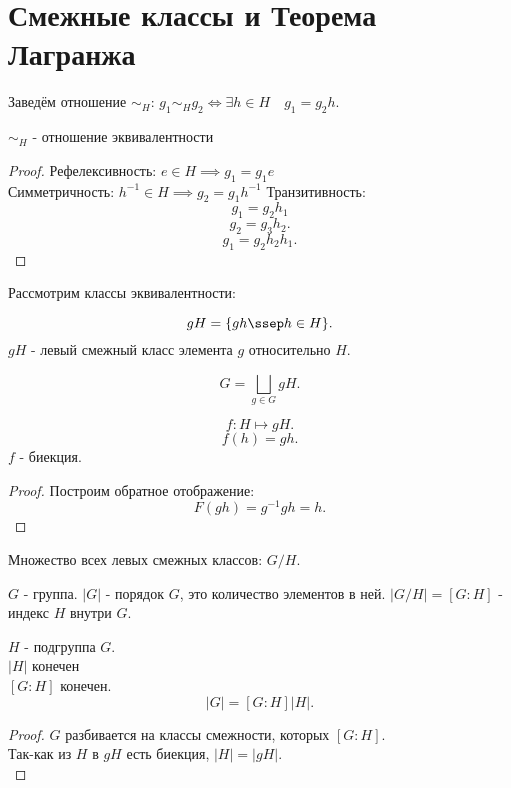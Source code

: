 \documentclass[11pt, oneside]{article}   	%
\begin{document}
\section{Смежные классы и Теорема Лагранжа}
    \begin{definition}
        Заведём отношение $\sim_H$: $g_1 \sim_H g_2 \iff \exists{h\in H}\quad g_1 = g_2h$.
    \end{definition}
    \begin{theorem}
        $\sim_H$ - отношение эквивалентности
        \begin{proof}
            Рефелексивность: $e \in H \implies g_1 = g_1e$\\
            Симметричность: $h^{-1}\in H \implies g_2 = g_1h^{-1}$
            Транзитивность:
            \[ g_1 = g_2h_1\]
            \[ g_2 = g_3h_2 .\]
            \[ g_1 = g_2h_2h_1 .\] 
        \end{proof}
    \end{theorem}
    Рассмотрим классы эквивалентности:
    \begin{definition}
        \[ gH = \{gh \ssep h\in H\}  .\]
        $gH$ - левый смежный класс элемента $g$ относительно $H$.
    \end{definition}
    \[ G = \bigsqcup_{g \in G} gH  .\]
    \begin{dlemma}
        \[ f: H \mapsto gH .\]
        \[ f(h) = gh .\]
        $f$ - биекция.
        \begin{proof}
            Построим обратное отображение:
            \[ F(gh) = g^{-1}gh = h .\] 
        \end{proof}
    \end{dlemma}
    \begin{definition}
        Множество всех левых смежных классов: $G/H$.
    \end{definition}
    \begin{definition}
        $G$ - группа. $|G|$ - порядок $G$, это количество элементов в ней.
        $|G/H| = \left[G : H\right]$ - индекс $H$ внутри $G$. 
    \end{definition}
    \begin{theorem}
        $H$ - подгруппа $G$.\\
        $|H|$ конечен\\
        $\left[G : H\right]$ конечен.\\
        \[ |G| = \left[G : H\right]|H| .\]
        \begin{proof}
            $G$ разбивается на классы смежности, которых $ \left[G : H\right]$.\\
            Так-как из $H$ в $gH$ есть биекция, $|H| = |gH|$.\\
        \end{proof}
    \end{theorem}
\end{document}
